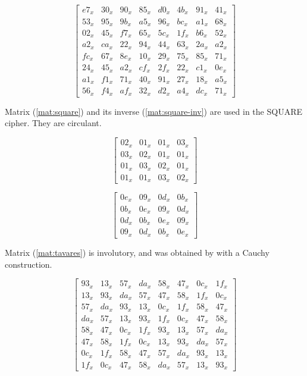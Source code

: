 \documentclass{report}
\begin{document}
\begin{footnotesize}
\begin{equation}\label{mat:shark-inv}
\begin{bmatrix}
e7_x &30_x &90_x &85_x &d0_x &4b_x &91_x &41_x\\
53_x &95_x &9b_x &a5_x &96_x &bc_x &a1_x &68_x\\
02_x &45_x &f7_x &65_x &5c_x &1f_x &b6_x &52_x\\
a2_x &ca_x &22_x &94_x &44_x &63_x &2a_x &a2_x\\
fc_x &67_x &8e_x &10_x &29_x &75_x &85_x &71_x\\
24_x &45_x &a2_x &cf_x &2f_x &22_x &c1_x &0e_x\\
a1_x &f1_x &71_x &40_x &91_x &27_x &18_x &a5_x\\
56_x &f4_x &af_x &32_x &d2_x &a4_x &dc_x &71_x
\end{bmatrix}
\end{equation}

Matrix (\ref{mat:square}) and its inverse (\ref{mat:square-inv}) are used in the SQUARE \cite{SQUARE1997} cipher. They are circulant.

\begin{equation}\label{mat:square}
\begin{bmatrix}
02_x & 01_x & 01_x & 03_x\\ 
03_x & 02_x & 01_x & 01_x\\
01_x & 03_x & 02_x & 01_x\\
01_x & 01_x & 03_x & 02_x
\end{bmatrix}
\end{equation}

\begin{equation}\label{mat:square-inv}
\begin{bmatrix}
0e_x & 09_x & 0d_x & 0b_x\\
0b_x & 0e_x & 09_x & 0d_x\\
0d_x & 0b_x & 0e_x & 09_x\\
09_x & 0d_x & 0b_x & 0e_x
\end{bmatrix}
\end{equation}

Matrix (\ref{mat:tavares}) is involutory, and was obtained by \cite{Youssef1997} with a Cauchy construction.

\begin{equation}\label{mat:tavares}
\begin{bmatrix}
93_x & 13_x & 57_x & da_x & 58_x & 47_x & 0c_x & 1f_x\\
13_x & 93_x & da_x & 57_x & 47_x & 58_x & 1f_x & 0c_x\\
57_x & da_x & 93_x & 13_x & 0c_x & 1f_x & 58_x & 47_x\\
da_x & 57_x & 13_x & 93_x & 1f_x & 0c_x & 47_x & 58_x\\
58_x & 47_x & 0c_x & 1f_x & 93_x & 13_x & 57_x & da_x\\
47_x & 58_x & 1f_x & 0c_x & 13_x & 93_x & da_x & 57_x\\
0c_x & 1f_x & 58_x & 47_x & 57_x & da_x & 93_x & 13_x\\
1f_x & 0c_x & 47_x & 58_x & da_x & 57_x & 13_x & 93_x
\end{bmatrix}
\end{equation}


\end{footnotesize}
\end{document}
